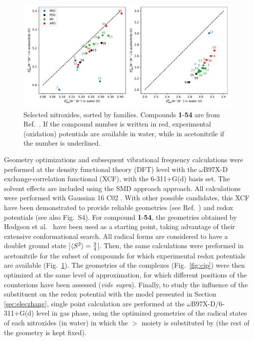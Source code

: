 \documentclass[review,preprint]{elsarticle}
\begin{document}
\begin{figure}[!p]
\centering
\includegraphics[width=\linewidth]{Figure7}
\caption{Selected nitroxides, sorted by families. Compounds \textbf{1}-\textbf{54} are from Ref.~.  If the compound number is written in red, experimental (oxidation) potentials are available in water, while in acetonitrile if the number is underlined.}
\label{fig:nitroxides}
\end{figure}

Geometry optimizations and subsequent vibrational frequency calculations were performed at the density functional theory (DFT) level with the $\omega$B97X-D exchange-correlation functional (XCF), with the 6-311+G(d)  basis set. The solvent effects are included using the SMD approach \cite{marenichUniversalSolvationModel2009} approach. All calculations were performed with Gaussian 16 C02 \cite{g16}. With other possible candidates, this XCF have been demonstrated to  provide reliable geometries (see Ref.~) and redox potentials  \cite{flores-leonarFurtherInsightsDFT2017,maierG4AccuracyDFT2020} (see also Fig.~S4).  For compound \textbf{1}-\textbf{54}, the geometries obtained by Hodgson et al.~\cite{hodgsonOneElectronOxidationReduction2007} have been used as a starting point, taking advantage of their extensive conformational search. All radical forms are considered to have a doublet ground state  [$\braket{S^2}=\frac{3}{4}$]. Then, the same calculations were preformed in acetonitrile for the subset of compounds for which experimental redox potentials are available (Fig.~\ref{fig:nitroxides}). The geometries of the complexes (Fig.~\ref{fig:cip}) were then optimized at the same level of approximation, for which different positions of the counterions have been assessed (\textit{vide supra}). Finally, to study the influence of the substituent on the redox potential with the model presented in Section \ref{sec:eleczhang}, single point calculation are performed at the $\omega$B97X-D/6-311+G(d) level in gas phase, using the optimized geometries of  the radical states of each nitroxides (in water) in which the  $>$ moiety is substituted by  (the rest of the geometry is kept fixed).
\end{document}
